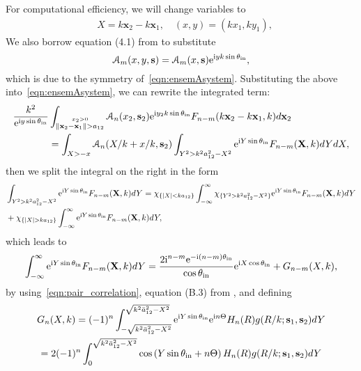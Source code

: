 \documentclass[12pt, a4paper]{article}
\begin{document}
For computational efficiency, we will change variables to
\begin{align}
& X = k\mathbf x_2 - k\mathbf x_1, \quad (x,y) = (kx_1,ky_1),
\end{align}
We also borrow equation (4.1) from \parencite{gower_reflection_2018} to substitute
\[
\mathcal A_m (x, y, \mathbf s) = \mathcal A_m (x, \mathbf s) \textrm{e}^{\textrm{i} y k \sin\theta_{\mathrm{in}}},
\]
which is due to the symmetry of~\eqref{eqn:ensemAsystem}. Substituting the above into~\eqref{eqn:ensemAsystem}, we can rewrite the integrated term:
\begin{align*}
   \frac{k^2}{\textrm{e}^{\textrm{i} y \sin\theta_{\mathrm{in}}}} & \int_{\stackrel{x_2 > 0 }{\|\mathbf x_2-\mathbf x_1 \| > a_{12}}} \mathcal A_n (x_2, \mathbf s_2) \textrm{e}^{\textrm{i} y_2 k \sin\theta_{\mathrm{in}}} F_{n-m}(k\mathbf x_2 - k \mathbf x_1,k) d \mathbf x_2
  \\
  &=\int_{X> -x} \mathcal A_n (X/k + x/k, \mathbf s_2) \int_{Y^2 > k^2 a_{12}^2 - X^2}
   \textrm{e}^{\textrm{i} Y \sin\theta_{\mathrm{in}}} F_{n-m}(\mathbf X,k) d Y d X,
\end{align*}
then we split the integral on the right in the form
\begin{align*}
  &\int_{Y^2 > k^2 a_{12}^2 - X^2} \ee^{\ii Y \sin\theta_\inc} F_{n-m}(\mathbf X,k) d Y
 = \chi_{\{ |X|< k a_{12}\}} \int_{-\infty}^{\infty} \chi_{\{ Y^2> k^2 a_{12}^2 - X^2\}} \ee^{\ii Y \sin\theta_\inc}
  F_{n-m}(\mathbf X,k) d Y
  \\
  & +  \chi_{\{ |X|> k a_{12}\}} \int_{-\infty}^\infty \ee^{\ii Y \sin\theta_\inc}
  F_{n-m}(\mathbf X,k) d Y,
\end{align*}
which leads to
\begin{equation}
  \int_{-\infty}^\infty \textrm{e}^{\textrm{i} Y \sin\theta_{\mathrm{in}}}
  F_{n-m}(\mathbf X,k) d Y = \frac{2 \textrm{i}^{n-m} \textrm{e}^{-\textrm{i}(n-m) \theta_{\mathrm{in}}}}{\cos \theta_{\mathrm{in}}} \textrm{e}^{\textrm{i} X \cos \theta_{\mathrm{in}} }
  + G_{n-m}(X, k),
\end{equation}
by using~\eqref{eqn:pair_correlation}, equation (B.3) from \cite{gower_reflection_2018}, and defining
\begin{multline}
G_n(X, k) = (-1)^{n} \int_{-\sqrt{k^2 \bar a_{12}^2 - X^2}}^{\sqrt{k^2\bar a_{12}^2 - X^2}} \textrm{e}^{\textrm{i} Y \sin\theta_{\mathrm{in}}}
  \textrm{e}^{\textrm{i} n \Theta} H_{n}(R)g(R/k;  \mathbf s_1,\mathbf s_2) d Y
  \\ = 2 (-1)^{n} \int_{0}^{\sqrt{k^2\bar a_{12}^2 - X^2}} \cos\left(Y \sin\theta_{\mathrm{in}} + n \Theta\right) H_{n}(R)g(R/k;  \mathbf s_1,\mathbf s_2) d Y
\end{multline}
\end{document}
